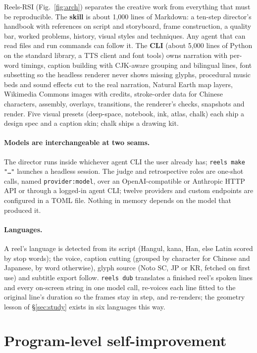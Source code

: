 \documentclass[11pt]{article}
\newcommand{\sys}{Reels-RSI}
\begin{document}
\sys{} (Fig.~\ref{fig:arch}) separates the creative work from everything that must be
reproducible. The \textbf{skill} is about 1{,}000 lines of Markdown: a ten-step director's handbook
with references on script and storyboard, frame construction, a quality bar, worked problems,
history, visual styles and techniques. Any agent that can read files and run commands can follow
it. The \textbf{CLI} (about 5{,}000 lines of Python on the standard library, a TTS client and font
tools) owns narration with per-word timings, caption building with CJK-aware grouping and bilingual
lines, font subsetting so the headless renderer never shows missing glyphs, procedural music beds
and sound effects cut to the real narration, Natural Earth map layers, Wikimedia Commons images with
credits, stroke-order data for Chinese characters, assembly, overlays, transitions, the renderer's
checks, snapshots and render. Five visual presets (deep-space, notebook, ink, atlas, chalk) each
ship a design spec and a caption skin; chalk ships a drawing kit.

\paragraph{Models are interchangeable at two seams.} The director runs inside whichever agent CLI
the user already has; \texttt{reels make "\ldots"} launches a headless session. The judge and
retrospective roles are one-shot calls, named \texttt{provider:model}, over an OpenAI-compatible or
Anthropic HTTP API or through a logged-in agent CLI; twelve providers and custom endpoints are
configured in a TOML file. Nothing in memory depends on the model that produced it.

\paragraph{Languages.} A reel's language is detected from its script (Hangul, kana, Han, else Latin
scored by stop words); the voice, caption cutting (grouped by character for Chinese and Japanese, by
word otherwise), glyph source (Noto SC, JP or KR, fetched on first use) and subtitle export follow.
\texttt{reels dub} translates a finished reel's spoken lines and every on-screen string in one model
call, re-voices each line fitted to the original line's duration so the frames stay in step, and
re-renders; the geometry lesson of \S\ref{sec:study} exists in six languages this way.

\section{Program-level self-improvement}
\label{sec:rsi}
\end{document}
